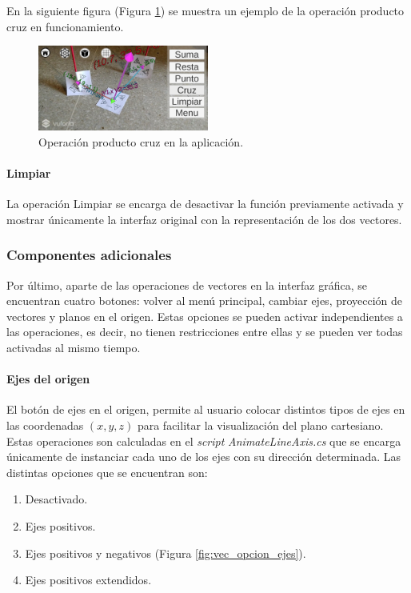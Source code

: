 En la siguiente figura (Figura \ref{fig:vec_cruz}) se muestra un ejemplo de la operación producto cruz en funcionamiento.

\begin{figure}[hbt!]
\centering
\includegraphics[width=0.5\textwidth]{figuras/vectores/ProductoCruz.png}
\caption{\label{fig:vec_cruz}Operación producto cruz en la aplicación.}
\end{figure}
\FloatBarrier

\paragraph{Limpiar}

La operación Limpiar se encarga de desactivar la función previamente activada y mostrar únicamente la interfaz original con la representación de los dos vectores.

\subsubsection{Componentes adicionales}
Por último, aparte de las operaciones de vectores en la interfaz gráfica, se encuentran cuatro botones: volver al menú principal, cambiar ejes, proyección de vectores y planos en el origen. Estas opciones se pueden activar independientes a las operaciones, es decir, no tienen restricciones entre ellas y se pueden ver todas activadas al mismo tiempo.

\paragraph{Ejes del origen}
El botón de ejes en el origen, permite al usuario colocar distintos tipos de ejes en las coordenadas $(x,y,z)$ para facilitar la visualización del plano cartesiano. Estas operaciones son calculadas en el \textit{script} \textit{AnimateLineAxis.cs} que se encarga únicamente de instanciar cada uno de los ejes con su dirección determinada.  Las distintas opciones que se encuentran son:

\begin{enumerate}
    \item Desactivado.
    \item Ejes positivos.
    \item Ejes positivos y negativos (Figura \ref{fig:vec_opcion_ejes}).
    \item Ejes positivos extendidos.
\end{enumerate}

